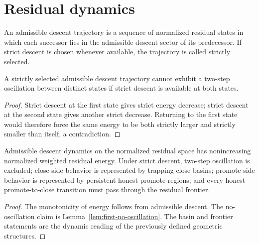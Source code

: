 \section{Residual dynamics}
\begin{definition}\label{def:admissible-descent-trajectory}
An admissible descent trajectory is a sequence of normalized residual states in which each successor lies in the admissible descent sector of its predecessor. If strict descent is chosen whenever available, the trajectory is called strictly selected.
\end{definition}

\begin{lemma}\label{lem:first-no-oscillation}
A strictly selected admissible descent trajectory cannot exhibit a two-step oscillation between distinct states if strict descent is available at both states.
\end{lemma}

\begin{proof}
Strict descent at the first state gives strict energy decrease; strict descent at the second state gives another strict decrease. Returning to the first state would therefore force the same energy to be both strictly larger and strictly smaller than itself, a contradiction.
\end{proof}

\begin{theorem}\label{thm:dynamic-control}
Admissible descent dynamics on the normalized residual space has nonincreasing normalized weighted residual energy. Under strict descent, two-step oscillation is excluded; close-side behavior is represented by trapping close basins; promote-side behavior is represented by persistent honest promote regions; and every honest promote-to-close transition must pass through the residual frontier.
\end{theorem}

\begin{proof}
The monotonicity of energy follows from admissible descent. The no-oscillation claim is Lemma~\ref{lem:first-no-oscillation}. The basin and frontier statements are the dynamic reading of the previously defined geometric structures.
\end{proof}

